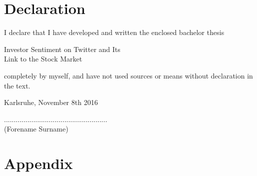 \documentclass[a4paper,12pt]{article}%
\begin{document}
\newpage
\section*{Declaration}

\vspace{2cm}
\begin{flushleft}
    I declare that I have developed and written the enclosed
    bachelor thesis\\[-0.3cm]
\end{flushleft}
\begin{center}
    {\large Investor Sentiment on Twitter and Its \\ Link to the Stock Market}\\[0.5cm]
\end{center}
    completely by myself, and have not used sources or means without
    declaration in the text.\\[2.5cm]

\begin{flushleft}
    Karlsruhe, November 8th 2016\\[0.1cm]
\end{flushleft}
\hspace*{9.0cm}.....................................................\\
\hspace*{10.1cm}(Forename Surname)

\newpage
{} %
%
%
%
%
\printbibliography


\newpage
{}
\section*{Appendix}
\setcounter{subsection}{0}
\renewcommand{\thesubsection}{\Roman{subsection}}
\renewcommand{\thesubsubsection}{\Alph{subsubsection}}
\end{document}
